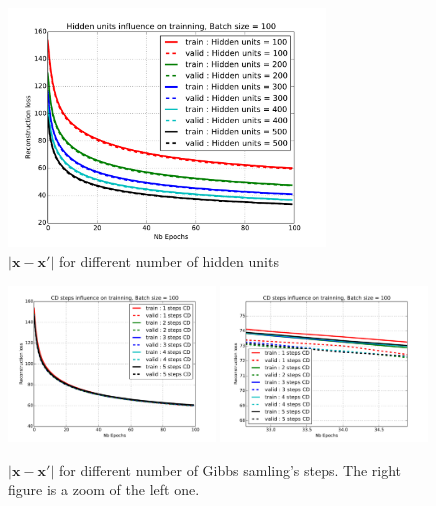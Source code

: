 \documentclass{article}
\begin{document}
\begin{figure}
\centering
\includegraphics[width=0.75\textwidth]{hidden_units}
\caption{$\lvert \mathbf{x} - \mathbf{x'} \rvert$ for different number of hidden units}
\label{fig:hidden}
\end{figure}

\begin{figure}
\centering
\includegraphics[width=0.49\textwidth]{CD}
\includegraphics[width=0.49\textwidth]{CD_zoom}
\caption{$\lvert \mathbf{x} - \mathbf{x'} \rvert$ for different number of Gibbs samling's steps. The right figure is a zoom of the left one.}
\label{CD}
\end{figure}
\end{document}
